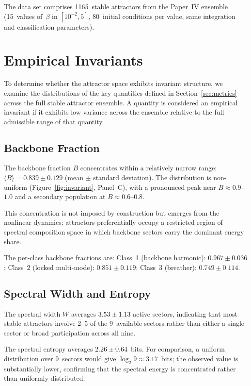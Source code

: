\documentclass[12pt,a4paper]{article}
\begin{document}
The data set comprises 1165~stable attractors from the Paper~IV
ensemble (15~values of~$\beta$ in $[10^{-2}, 5]$, 80~initial
conditions per value, same integration and classification parameters).


\section{Empirical Invariants}\label{sec:invariants}

To determine whether the attractor space exhibits invariant structure,
we examine the distributions of the key quantities defined in
Section~\ref{sec:metrics} across the full stable attractor ensemble.
A quantity is considered an empirical invariant if it exhibits low
variance across the ensemble relative to the full admissible range of
that quantity.

\subsection{Backbone Fraction}

The backbone fraction $B$ concentrates within a relatively narrow
range: $\langle B \rangle = 0.839 \pm 0.129$ (mean $\pm$ standard
deviation).  The distribution is non-uniform
(Figure~\ref{fig:invariant}, Panel~C), with a pronounced peak near
$B \approx 0.9$--$1.0$ and a secondary population at
$B \approx 0.6$--$0.8$.

This concentration is not imposed by construction but emerges from
the nonlinear dynamics: attractors preferentially occupy a restricted
region of spectral composition space in which backbone sectors carry
the dominant energy share.

The per-class backbone fractions are:
Class~1 (backbone harmonic): $0.967 \pm 0.036$;
Class~2 (locked multi-mode): $0.851 \pm 0.119$;
Class~3 (breather): $0.749 \pm 0.114$.

\subsection{Spectral Width and Entropy}

The spectral width $W$ averages $3.53 \pm 1.13$ active sectors,
indicating that most stable attractors involve 2--5 of the 9~available
sectors rather than either a single sector or broad participation
across all nine.

The spectral entropy averages $2.26 \pm 0.64$~bits.  For comparison,
a uniform distribution over 9~sectors would give $\log_2 9 \approx
3.17$~bits; the observed value is substantially lower, confirming
that the spectral energy is concentrated rather than uniformly
distributed.
\end{document}

